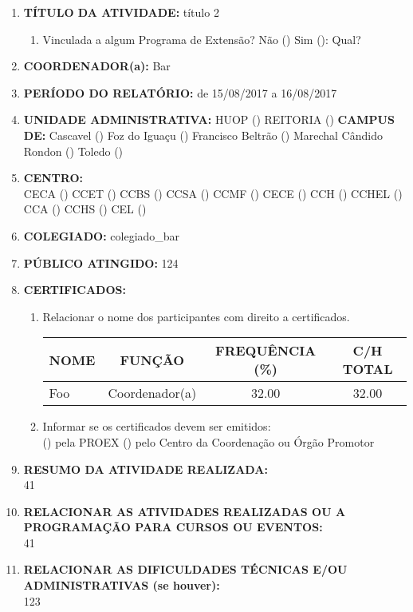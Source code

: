 \documentclass[12pt,a4paper,oneside]{article}%
\begin{document}
\begin{enumerate}%
\item%
\textbf{TÍTULO DA ATIVIDADE: }%
título 2%
\begin{enumerate}%
\item%
Vinculada a algum Programa de Extensão? %
Não () Sim (): Qual? %
\end{enumerate}%
\item%
\textbf{COORDENADOR(a): }%
Bar%
\item%
\textbf{PERÍODO DO RELATÓRIO: }%
de 15/08/2017 a 16/08/2017%
\item%
\textbf{UNIDADE ADMINISTRATIVA: }%
HUOP () %
REITORIA () %
\newline%
\textbf{CAMPUS DE: }%
Cascavel () %
Foz do Iguaçu () %
Francisco Beltrão () %
Marechal Cândido Rondon () %
Toledo () %
\item%
\textbf{CENTRO: \\}%
CECA () %
CCET () %
CCBS () %
CCSA () %
CCMF () %
CECE () %
CCH () %
CCHEL () %
CCA () %
CCHS () %
CEL () %
\item%
\textbf{COLEGIADO: }%
colegiado\_bar%
\item%
\textbf{PÚBLICO ATINGIDO: }%
124%
\item%
\textbf{CERTIFICADOS: }%
\begin{enumerate}%
\item%
Relacionar o nome dos participantes com direito a certificados. \\%
\begin{tabularx}{\linewidth}{|>{\centering\arraybackslash}X|
                                  @{  }c@{  }|
                                  @{  }c@{  }|
                                  @{  }c@{  }|
                              }%
\hline%
NOME&FUNÇÃO&FREQUÊNCIA (\%)&C/H TOTAL\\%
\hline%
Foo&Coordenador(a)&32.00&32.00\\%
\hline%
\end{tabularx}%
\linebreak%
\item%
Informar se os certificados devem ser emitidos: \\%
() pela PROEX \hfill () pelo Centro da Coordenação ou Órgão Promotor%
\end{enumerate}%
\item%
\textbf{RESUMO DA ATIVIDADE REALIZADA: \\}%
41%
\item%
\textbf{RELACIONAR AS ATIVIDADES REALIZADAS OU A PROGRAMAÇÃO PARA CURSOS OU EVENTOS: \\}%
41%
\item%
\textbf{RELACIONAR AS DIFICULDADES TÉCNICAS E/OU ADMINISTRATIVAS (se houver): \\}%
123%
\end{enumerate}%
\end{document}
